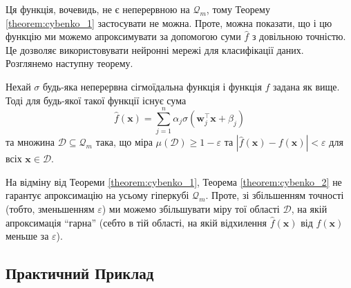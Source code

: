 Ця функція, вочевидь, не є неперервною на $\mathcal{Q}_m$, тому Теорему
\ref{theorem:cybenko_1} застосувати не можна. Проте, можна показати, що і цю
функцію ми можемо апроксимувати за допомогою суми $\widehat{f}$ з довільною
точністю. Це дозволяє використовувати нейронні мережі для класифікації даних.
Розглянемо наступну теорему.
\begin{theorem}\label{theorem:cybenko_2}
    Нехай $\sigma$ будь-яка неперервна сігмоїдальна функція і функція
    $f$ задана як вище. Тоді для будь-якої такої функції існує сума
    \begin{equation*}
        \widehat{f}(\mathbf{x}) = \sum_{j=1}^n \alpha_j \sigma(\boldsymbol{w}_j^{\top}\mathbf{x} + \beta_j)
    \end{equation*}
    та множина $\mathcal{D} \subseteq \mathcal{Q}_m$ така, що міра
    $\mu(\mathcal{D}) \geq 1-\varepsilon$ та $|\widehat{f}(\mathbf{x}) -
    f(\mathbf{x})| < \varepsilon$ для всіх $\mathbf{x} \in \mathcal{D}$.
\end{theorem}

На відміну від Теореми \ref{theorem:cybenko_1}, Теорема \ref{theorem:cybenko_2}
не гарантує апроксимацію на усьому гіперкубі $\mathcal{Q}_m$. Проте, зі
збільшенням точності (тобто, зменьшенням $\varepsilon$) ми можемо збільшувати
міру тої області $\mathcal{D}$, на якій апроксимація ``гарна'' (себто в тій
області, на якій відхилення $\widehat{f}(\mathbf{x})$ від $f(\mathbf{x})$ меньше за
$\varepsilon$).

\subsection{Практичний Приклад}

